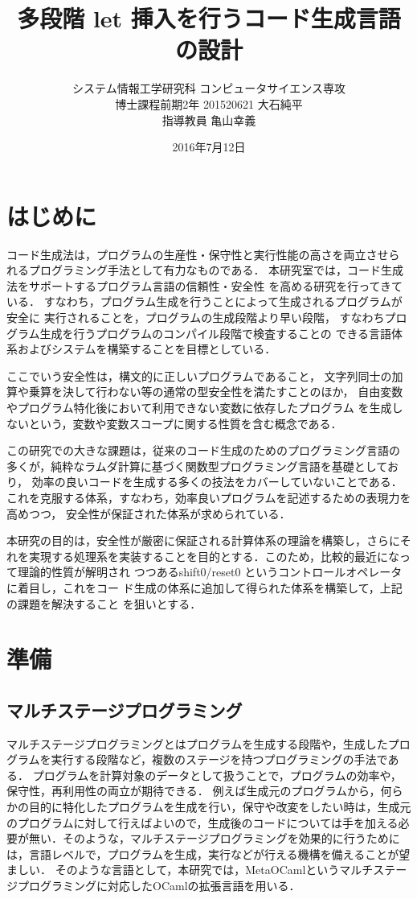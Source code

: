 \documentclass[10pt,a4j,twocolumn]{jarticle}
\title {\vspace{-2.0cm}多段階 let 挿入を行うコード生成言語の設計}
\date{2016年7月12日}
\author{システム情報工学研究科 コンピュータサイエンス専攻 \\
  博士課程前期2年 201520621 大石純平 \\
  指導教員 亀山幸義
}
\theoremstyle{definition}
\begin{document}
\maketitle
\section{はじめに}
コード生成法は，プログラムの生産性・保守性と実行性能の高さを両立させら
れるプログラミング手法として有力なものである．
本研究室では，コード生成法をサポートするプログラム言語の信頼性・安全性
を高める研究を行ってきている．
すなわち，プログラム生成を行うことによって生成されるプログラムが安全に
実行されることを，プログラムの生成段階より早い段階，
すなわちプログラム生成を行うプログラムのコンパイル段階で検査することの
できる言語体系およびシステムを構築することを目標としている．

ここでいう安全性は，構文的に正しいプログラムであること，
文字列同士の加算や乗算を決して行わない等の通常の型安全性を満たすことのほか，
自由変数やプログラム特化後において利用できない変数に依存したプログラム
を生成しないという，変数や変数スコープに関する性質を含む概念である．

この研究での大きな課題は，従来のコード生成のためのプログラミング言語の
多くが，純粋なラムダ計算に基づく関数型プログラミング言語を基礎としており，
効率の良いコードを生成する多くの技法をカバーしていないことである．
これを克服する体系，すなわち，効率良いプログラムを記述するための表現力を高めつつ，
安全性が保証された体系が求められている．

本研究の目的は，安全性が厳密に保証される計算体系の理論を構築し，さらにそれを実現する処理系を実装することを目的とする．このため，比較的最近になって理論的性質が解明され
つつあるshift0/reset0 というコントロールオペレータに着目し，これをコー
ド生成の体系に追加して得られた体系を構築して，上記の課題を解決すること
を狙いとする．

\section{準備}
\subsection{マルチステージプログラミング}
マルチステージプログラミングとはプログラムを生成する段階や，生成したプログラムを実行する段階など，複数のステージを持つプログラミングの手法である．
プログラムを計算対象のデータとして扱うことで，プログラムの効率や，保守性，再利用性の両立が期待できる．
例えば生成元のプログラムから，何らかの目的に特化したプログラムを生成を行い，保守や改変をしたい時は，生成元のプログラムに対して行えばよいので，生成後のコードについては手を加える必要が無い．そのような，マルチステージプログラミングを効果的に行うためには，言語レベルで，プログラムを生成，実行などが行える機構を備えることが望ましい．
そのような言語として，本研究では，MetaOCamlというマルチステージプログラミングに対応したOCamlの拡張言語を用いる．
\end{document}
